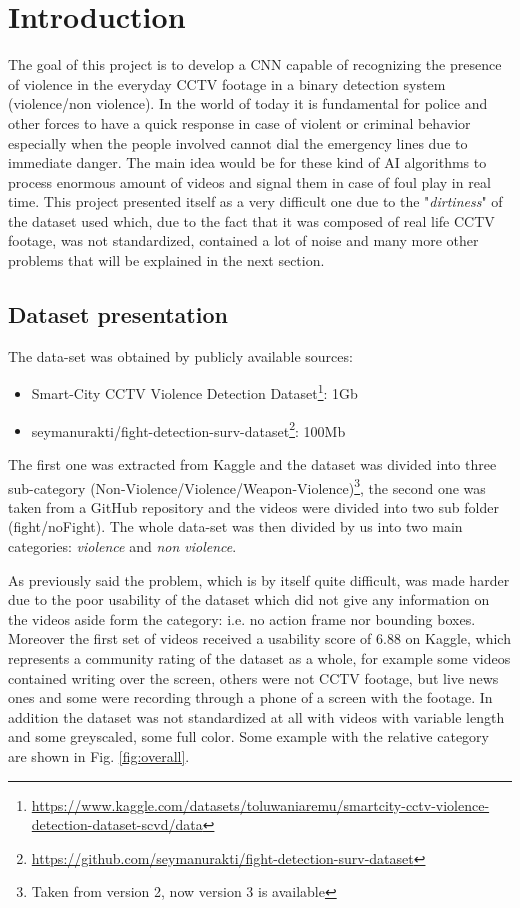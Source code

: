 \chapter{Introduction}
The goal of this project is to develop a CNN capable of recognizing the presence of violence in the everyday CCTV footage in a binary detection system (violence/non violence). In the world of today it is fundamental for police and other forces to have a quick response in case of violent or criminal behavior especially when the people involved cannot dial the emergency lines due to immediate danger. The main idea would be for these kind of AI algorithms to process enormous amount of videos and signal them in case of foul play in real time. This project presented itself as a very difficult one due to the "\textit{dirtiness}" of the dataset used which, due to the fact that it was composed of real life CCTV footage, was not standardized, contained a lot of noise and many more other problems that will be explained in the next section.

\section{Dataset presentation}
The data-set was obtained by publicly available sources:
\begin{itemize}
	\item Smart-City CCTV Violence Detection Dataset\footnote{\url{https://www.kaggle.com/datasets/toluwaniaremu/smartcity-cctv-violence-detection-dataset-scvd/data}}: 1Gb
	\item seymanurakti/fight-detection-surv-dataset\footnote{\url{https://github.com/seymanurakti/fight-detection-surv-dataset}}: 100Mb
\end{itemize}

The first one was extracted from Kaggle and the dataset was divided into three sub-category (Non-Violence/Violence/Weapon-Violence)\footnote{Taken from version 2, now version 3 is available}, the second one was taken from a GitHub repository and the videos were divided into two sub folder (fight/noFight). The whole data-set was then divided by us into two main categories: \textit{violence} and \textit{non violence}.

As previously said the problem, which is by itself quite difficult, was made harder due to the poor usability of the dataset which did not give any information on the videos aside form the category: i.e. no action frame nor bounding boxes. Moreover the first set of videos received a usability score of 6.88 on Kaggle, which represents a community rating of the dataset as a whole, for example some videos contained writing over the screen, others were not CCTV footage, but live news ones and some were recording through a phone of a screen with the footage. In addition the dataset was not standardized at all with videos with variable length and some greyscaled, some full color. Some example with the relative category are shown in Fig. \ref{fig:overall}.

